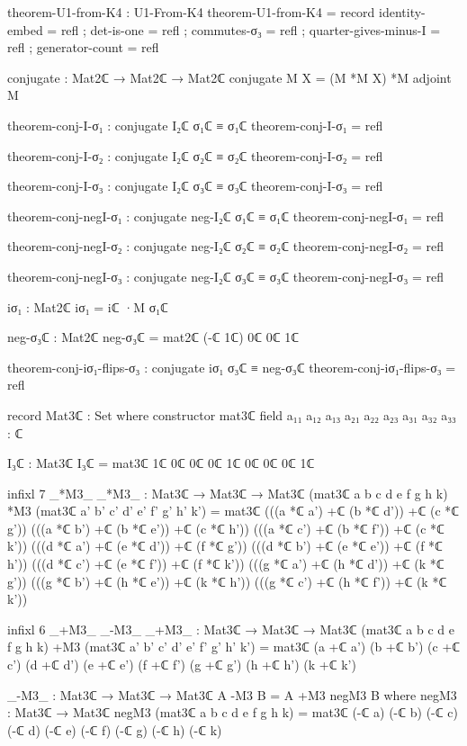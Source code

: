 \documentclass[11pt,a4paper]{book}
\begin{document}
\begin{code}
theorem-U1-from-K4 : U1-From-K4
theorem-U1-from-K4 = record
  { identity-embed       = refl
  ; det-is-one           = refl
  ; commutes-σ₃          = refl
  ; quarter-gives-minus-I = refl
  ; generator-count      = refl
  }

conjugate : Mat2ℂ → Mat2ℂ → Mat2ℂ
conjugate M X = (M *M X) *M adjoint M

theorem-conj-I-σ₁ : conjugate I₂ℂ σ₁ℂ ≡ σ₁ℂ
theorem-conj-I-σ₁ = refl

theorem-conj-I-σ₂ : conjugate I₂ℂ σ₂ℂ ≡ σ₂ℂ
theorem-conj-I-σ₂ = refl

theorem-conj-I-σ₃ : conjugate I₂ℂ σ₃ℂ ≡ σ₃ℂ
theorem-conj-I-σ₃ = refl

theorem-conj-negI-σ₁ : conjugate neg-I₂ℂ σ₁ℂ ≡ σ₁ℂ
theorem-conj-negI-σ₁ = refl

theorem-conj-negI-σ₂ : conjugate neg-I₂ℂ σ₂ℂ ≡ σ₂ℂ
theorem-conj-negI-σ₂ = refl

theorem-conj-negI-σ₃ : conjugate neg-I₂ℂ σ₃ℂ ≡ σ₃ℂ
theorem-conj-negI-σ₃ = refl

iσ₁ : Mat2ℂ
iσ₁ = iℂ ·M σ₁ℂ

neg-σ₃ℂ : Mat2ℂ
neg-σ₃ℂ = mat2ℂ (-ℂ 1ℂ) 0ℂ 0ℂ 1ℂ

theorem-conj-iσ₁-flips-σ₃ : conjugate iσ₁ σ₃ℂ ≡ neg-σ₃ℂ
theorem-conj-iσ₁-flips-σ₃ = refl

record Mat3ℂ : Set where
  constructor mat3ℂ
  field
    a₁₁ a₁₂ a₁₃ a₂₁ a₂₂ a₂₃ a₃₁ a₃₂ a₃₃ : ℂ

I₃ℂ : Mat3ℂ
I₃ℂ = mat3ℂ 1ℂ 0ℂ 0ℂ 0ℂ 1ℂ 0ℂ 0ℂ 0ℂ 1ℂ

infixl 7 _*M3_
_*M3_ : Mat3ℂ → Mat3ℂ → Mat3ℂ
(mat3ℂ a b c d e f g h k) *M3 (mat3ℂ a' b' c' d' e' f' g' h' k') =
  mat3ℂ (((a *ℂ a') +ℂ (b *ℂ d')) +ℂ (c *ℂ g'))
         (((a *ℂ b') +ℂ (b *ℂ e')) +ℂ (c *ℂ h'))
         (((a *ℂ c') +ℂ (b *ℂ f')) +ℂ (c *ℂ k'))
         (((d *ℂ a') +ℂ (e *ℂ d')) +ℂ (f *ℂ g'))
         (((d *ℂ b') +ℂ (e *ℂ e')) +ℂ (f *ℂ h'))
         (((d *ℂ c') +ℂ (e *ℂ f')) +ℂ (f *ℂ k'))
         (((g *ℂ a') +ℂ (h *ℂ d')) +ℂ (k *ℂ g'))
         (((g *ℂ b') +ℂ (h *ℂ e')) +ℂ (k *ℂ h'))
         (((g *ℂ c') +ℂ (h *ℂ f')) +ℂ (k *ℂ k'))

infixl 6 _+M3_ _-M3_
_+M3_ : Mat3ℂ → Mat3ℂ → Mat3ℂ
(mat3ℂ a b c d e f g h k) +M3 (mat3ℂ a' b' c' d' e' f' g' h' k') =
  mat3ℂ (a +ℂ a') (b +ℂ b') (c +ℂ c')
         (d +ℂ d') (e +ℂ e') (f +ℂ f')
         (g +ℂ g') (h +ℂ h') (k +ℂ k')

_-M3_ : Mat3ℂ → Mat3ℂ → Mat3ℂ
A -M3 B = A +M3 negM3 B
  where
  negM3 : Mat3ℂ → Mat3ℂ
  negM3 (mat3ℂ a b c d e f g h k) =
    mat3ℂ (-ℂ a) (-ℂ b) (-ℂ c) (-ℂ d) (-ℂ e) (-ℂ f) (-ℂ g) (-ℂ h) (-ℂ k)


\end{code}
\end{document}
